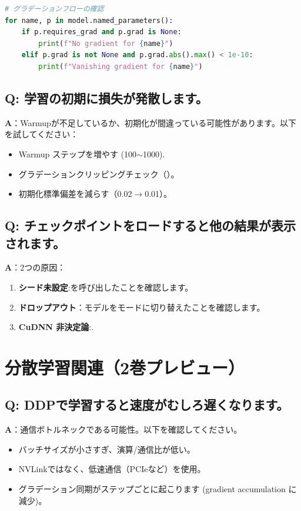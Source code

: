 \begin{lstlisting}[language=Python]
# グラデーションフローの確認
for name, p in model.named_parameters():
    if p.requires_grad and p.grad is None:
        print(f"No gradient for {name}")
    elif p.grad is not None and p.grad.abs().max() < 1e-10:
        print(f"Vanishing gradient for {name}")
\end{lstlisting}

\subsection{Q: 学習の初期に損失が発散します。}

\textbf{A}：Warmupが不足しているか、初期化が間違っている可能性があります。以下を試してください：
\begin{itemize}
\item Warmup ステップを増やす (100$\sim$1000).
\item グラデーションクリッピングチェック（）。
\item 初期化標準偏差を減らす（0.02$\to$0.01）。
\end{itemize}

\subsection{Q: チェックポイントをロードすると他の結果が表示されます。}

\textbf{A}：2つの原因：
\begin{enumerate}
\item\textbf{シード未設定}:を呼び出したことを確認します。
\item\textbf{ドロップアウト}：モデルをモードに切り替えたことを確認します。
\item\textbf{CuDNN 非決定論}:.
\end{enumerate}

\section{分散学習関連（2巻プレビュー）}

\subsection{Q: DDPで学習すると速度がむしろ遅くなります。}

\textbf{A}：通信ボトルネックである可能性。以下を確認してください。
\begin{itemize}
\item バッチサイズが小さすぎ、演算/通信比が低い。
\item NVLinkではなく、低速通信（PCIeなど）を使用。
\item グラデーション同期がステップごとに起こります (gradient accumulation に減少)。
\end{itemize}

